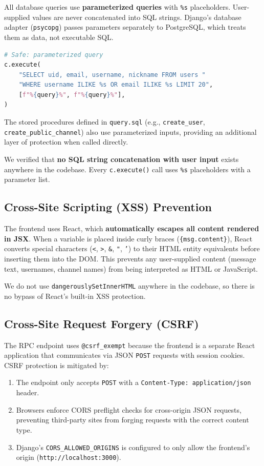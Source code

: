 \documentclass[11pt]{article}
\begin{document}
All database queries use \textbf{parameterized queries} with \texttt{\%s} placeholders. User-supplied values are never concatenated into SQL strings. Django's database adapter (\texttt{psycopg}) passes parameters separately to PostgreSQL, which treats them as data, not executable SQL.

\begin{lstlisting}[language=Python]
# Safe: parameterized query
c.execute(
    "SELECT uid, email, username, nickname FROM users "
    "WHERE username ILIKE %s OR email ILIKE %s LIMIT 20",
    [f"%{query}%", f"%{query}%"],
)
\end{lstlisting}

The stored procedures defined in \texttt{query.sql} (e.g., \texttt{create\_user}, \texttt{create\_public\_channel}) also use parameterized inputs, providing an additional layer of protection when called directly.

We verified that \textbf{no SQL string concatenation with user input} exists anywhere in the codebase. Every \texttt{c.execute()} call uses \texttt{\%s} placeholders with a parameter list.

\subsection{Cross-Site Scripting (XSS) Prevention}

The frontend uses React, which \textbf{automatically escapes all content rendered in JSX}. When a variable is placed inside curly braces (\texttt{\{msg.content\}}), React converts special characters (\texttt{<}, \texttt{>}, \texttt{\&}, \texttt{"}, \texttt{'}) to their HTML entity equivalents before inserting them into the DOM. This prevents any user-supplied content (message text, usernames, channel names) from being interpreted as HTML or JavaScript.

We do not use \texttt{dangerouslySetInnerHTML} anywhere in the codebase, so there is no bypass of React's built-in XSS protection.

\subsection{Cross-Site Request Forgery (CSRF)}

The RPC endpoint uses \texttt{@csrf\_exempt} because the frontend is a separate React application that communicates via JSON \texttt{POST} requests with session cookies. CSRF protection is mitigated by:
\begin{enumerate}
    \item The endpoint only accepts \texttt{POST} with a \texttt{Content-Type: application/json} header.
    \item Browsers enforce CORS preflight checks for cross-origin JSON requests, preventing third-party sites from forging requests with the correct content type.
    \item Django's \texttt{CORS\_ALLOWED\_ORIGINS} is configured to only allow the frontend's origin (\texttt{http://localhost:3000}).
\end{enumerate}
\end{document}
